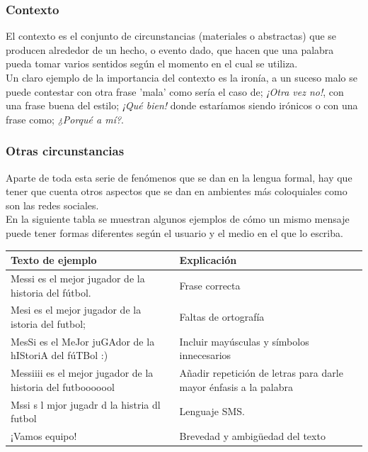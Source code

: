 \documentclass[../all.tex]{subfiles}
\begin{document}
\subsubsection{Contexto}
	El contexto es el conjunto de circunstancias (materiales o abstractas) que se producen alrededor de un hecho, o evento dado, que hacen que una palabra pueda tomar varios sentidos según el momento en el cual se utiliza.\\
	
	Un claro ejemplo de la importancia del contexto es la ironía, a un suceso malo se puede contestar con otra frase 'mala' como sería el caso de; \textit{¡Otra vez no!}, con una frase buena del estilo; \textit{¡Qué bien!} donde estaríamos siendo irónicos o con una frase como; \textit{¿Porqué a mí?}.
	
\subsubsection{Otras circunstancias}

	Aparte de toda esta serie de fenómenos que se dan en la lengua formal, hay que tener que cuenta otros aspectos que se dan en ambientes más coloquiales como son las redes sociales.\\
	
	En la siguiente tabla se muestran algunos ejemplos de cómo un mismo mensaje puede tener formas diferentes según el usuario y el medio en el que lo escriba.
	\begin{center}
		\begin{tabular}{ | m{7cm}| m{7cm} | } 
			\hline
			\textbf{Texto de ejemplo} & \textbf{Explicación}\\ 
			\hline
			Messi es el mejor jugador de la historia del fútbol. & Frase correcta \\ 
			\hline
			Mesi es el mejor jugador de la istoria del futbol; & Faltas de ortografía\\ 
			\hline
			MesSi es el MeJor juGAdor de la hIStoriA del fúTBol :) & Incluir mayúsculas y símbolos innecesarios\\ 
			\hline
			Messiiii es el mejor jugador de la historia del futbooooool & Añadir repetición de letras para darle mayor énfasis a la palabra\\ 
			\hline
			Mssi s l mjor jugadr d la histria dl futbol  & Lenguaje SMS.\\ 
			\hline
			¡Vamos equipo! & Brevedad y ambigüedad del texto \\ 
			\hline
		\end{tabular}
	\end{center}
\end{document}
